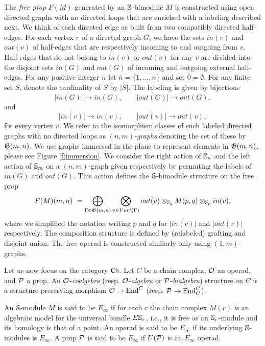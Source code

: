 The \textit{free prop} $F(M)$ generated by an \mbox{$\S$-bimodule} $M$ is constructed using open directed graphs with no directed loops that are enriched with a labeling described next. We think of each directed edge as built from two compatibly directed half-edges. For each vertex $v$ of a directed graph $G$, we have the sets $in(v)$ and $out(v)$ of half-edges that are respectively incoming to and outgoing from $v$. Half-edges that do not belong to $in(v)$ or $out(v)$ for any $v$ are divided into the disjoint sets $in(G)$ and $out(G)$ of incoming and outgoing external half-edges. For any positive integer $n$ let $\overline{n} = \{1,\dots,n\}$ and set $\overline{0} = \emptyset$. For any finite set $S$, denote the cardinality of $S$ by $|S|$. The labeling is given by bijections  
\begin{equation*}
\overline{|in(G)|}\to in(G), \qquad
\overline{|out(G)|}\to out(G),
\end{equation*}
and
\begin{equation*}
\overline{|in(v)|}\to in(v), \qquad
\overline{|out(v)|}\to out(v),
\end{equation*}
for every vertex $v$.
We refer to the isomorphism classes of such labeled directed graphs with no directed loops as $(n,m)$\textit{-graphs} denoting the set of these by $\G(m,n)$.
We use graphs immersed in the plane to represent elements in $\G(m,n)$, please see Figure \ref{f:immersion}.
We consider the right action of $\S_n$ and the left action of $\S_m$ on a $(n,m)$-graph given respectively by permuting the labels of $in(G)$ and $out(G)$. This action defines the $\S$-bimodule structure on the free prop
\begin{equation} \label{e:free prop}
F(M)(m,n) \ = \bigoplus_{\Gamma \in \G(m,n)} \bigotimes_{v \in Vert(\Gamma)} out(v) \otimes_{\S_q} M(p, q) \otimes_{\S_p} in(v),
\end{equation}
where we simplified the notation writing $p$ and $q$ for $\overline{|in(v)|}$ and $\overline{|out(v)|}$ respectively. The composition structure is defined by (relabeled) grafting and disjoint union.
The free operad is constructed similarly only using $(1,m)$-graphs.

Let us now focus on the category $\Ch$.
Let $C$ be a chain complex, $\O$ an operad, and $\P$ a prop.
An $\O$-\textit{coalgebra} (resp. $\O$-\textit{algebra} or $\P$-\textit{bialgebra}) structure on $C$ is a structure preserving morphism $\O \to \End^C$ (resp. $\P \to \End_C^C$).

An $\S$-module $M$ is said to be $E_\infty$ if for each $r$ the chain complex $M(r)$ is an algebraic model for the universal bundle $E\S_r$, i.e., it is free as an $\S_r$-module and its homology is that of a point.
An operad is said to be $E_\infty$ if its underlying $\S$-modules is $E_\infty$.
A prop $\P$ is said to be $E_\infty$ if $U(\P)$ is an $E_\infty$ operad.

